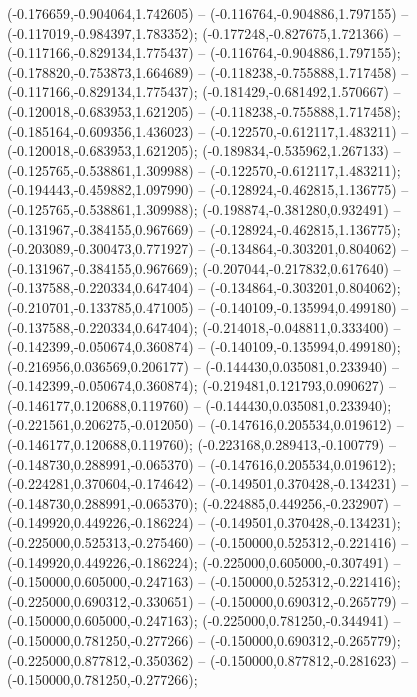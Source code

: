  (-0.176659,-0.904064,1.742605) -- (-0.116764,-0.904886,1.797155) -- (-0.117019,-0.984397,1.783352);
 (-0.177248,-0.827675,1.721366) -- (-0.117166,-0.829134,1.775437) -- (-0.116764,-0.904886,1.797155);
 (-0.178820,-0.753873,1.664689) -- (-0.118238,-0.755888,1.717458) -- (-0.117166,-0.829134,1.775437);
 (-0.181429,-0.681492,1.570667) -- (-0.120018,-0.683953,1.621205) -- (-0.118238,-0.755888,1.717458);
 (-0.185164,-0.609356,1.436023) -- (-0.122570,-0.612117,1.483211) -- (-0.120018,-0.683953,1.621205);
 (-0.189834,-0.535962,1.267133) -- (-0.125765,-0.538861,1.309988) -- (-0.122570,-0.612117,1.483211);
 (-0.194443,-0.459882,1.097990) -- (-0.128924,-0.462815,1.136775) -- (-0.125765,-0.538861,1.309988);
 (-0.198874,-0.381280,0.932491) -- (-0.131967,-0.384155,0.967669) -- (-0.128924,-0.462815,1.136775);
 (-0.203089,-0.300473,0.771927) -- (-0.134864,-0.303201,0.804062) -- (-0.131967,-0.384155,0.967669);
 (-0.207044,-0.217832,0.617640) -- (-0.137588,-0.220334,0.647404) -- (-0.134864,-0.303201,0.804062);
 (-0.210701,-0.133785,0.471005) -- (-0.140109,-0.135994,0.499180) -- (-0.137588,-0.220334,0.647404);
 (-0.214018,-0.048811,0.333400) -- (-0.142399,-0.050674,0.360874) -- (-0.140109,-0.135994,0.499180);
 (-0.216956,0.036569,0.206177) -- (-0.144430,0.035081,0.233940) -- (-0.142399,-0.050674,0.360874);
 (-0.219481,0.121793,0.090627) -- (-0.146177,0.120688,0.119760) -- (-0.144430,0.035081,0.233940);
 (-0.221561,0.206275,-0.012050) -- (-0.147616,0.205534,0.019612) -- (-0.146177,0.120688,0.119760);
 (-0.223168,0.289413,-0.100779) -- (-0.148730,0.288991,-0.065370) -- (-0.147616,0.205534,0.019612);
 (-0.224281,0.370604,-0.174642) -- (-0.149501,0.370428,-0.134231) -- (-0.148730,0.288991,-0.065370);
 (-0.224885,0.449256,-0.232907) -- (-0.149920,0.449226,-0.186224) -- (-0.149501,0.370428,-0.134231);
 (-0.225000,0.525313,-0.275460) -- (-0.150000,0.525312,-0.221416) -- (-0.149920,0.449226,-0.186224);
 (-0.225000,0.605000,-0.307491) -- (-0.150000,0.605000,-0.247163) -- (-0.150000,0.525312,-0.221416);
 (-0.225000,0.690312,-0.330651) -- (-0.150000,0.690312,-0.265779) -- (-0.150000,0.605000,-0.247163);
 (-0.225000,0.781250,-0.344941) -- (-0.150000,0.781250,-0.277266) -- (-0.150000,0.690312,-0.265779);
 (-0.225000,0.877812,-0.350362) -- (-0.150000,0.877812,-0.281623) -- (-0.150000,0.781250,-0.277266);
